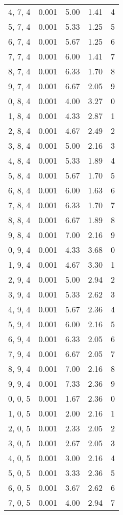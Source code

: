 \documentclass[12pt]{article}
\begin{document}
\begin{tabular}{c || c || c | c | c}
4, 7, 4 & 0.001 & 5.00 & 1.41 & 4 \\
5, 7, 4 & 0.001 & 5.33 & 1.25 & 5 \\
6, 7, 4 & 0.001 & 5.67 & 1.25 & 6 \\
7, 7, 4 & 0.001 & 6.00 & 1.41 & 7 \\
8, 7, 4 & 0.001 & 6.33 & 1.70 & 8 \\
9, 7, 4 & 0.001 & 6.67 & 2.05 & 9 \\
0, 8, 4 & 0.001 & 4.00 & 3.27 & 0 \\
1, 8, 4 & 0.001 & 4.33 & 2.87 & 1 \\
2, 8, 4 & 0.001 & 4.67 & 2.49 & 2 \\
3, 8, 4 & 0.001 & 5.00 & 2.16 & 3 \\
4, 8, 4 & 0.001 & 5.33 & 1.89 & 4 \\
5, 8, 4 & 0.001 & 5.67 & 1.70 & 5 \\
6, 8, 4 & 0.001 & 6.00 & 1.63 & 6 \\
7, 8, 4 & 0.001 & 6.33 & 1.70 & 7 \\
8, 8, 4 & 0.001 & 6.67 & 1.89 & 8 \\
9, 8, 4 & 0.001 & 7.00 & 2.16 & 9 \\
0, 9, 4 & 0.001 & 4.33 & 3.68 & 0 \\
1, 9, 4 & 0.001 & 4.67 & 3.30 & 1 \\
2, 9, 4 & 0.001 & 5.00 & 2.94 & 2 \\
3, 9, 4 & 0.001 & 5.33 & 2.62 & 3 \\
4, 9, 4 & 0.001 & 5.67 & 2.36 & 4 \\
5, 9, 4 & 0.001 & 6.00 & 2.16 & 5 \\
6, 9, 4 & 0.001 & 6.33 & 2.05 & 6 \\
7, 9, 4 & 0.001 & 6.67 & 2.05 & 7 \\
8, 9, 4 & 0.001 & 7.00 & 2.16 & 8 \\
9, 9, 4 & 0.001 & 7.33 & 2.36 & 9 \\
0, 0, 5 & 0.001 & 1.67 & 2.36 & 0 \\
1, 0, 5 & 0.001 & 2.00 & 2.16 & 1 \\
2, 0, 5 & 0.001 & 2.33 & 2.05 & 2 \\
3, 0, 5 & 0.001 & 2.67 & 2.05 & 3 \\
4, 0, 5 & 0.001 & 3.00 & 2.16 & 4 \\
5, 0, 5 & 0.001 & 3.33 & 2.36 & 5 \\
6, 0, 5 & 0.001 & 3.67 & 2.62 & 6 \\
7, 0, 5 & 0.001 & 4.00 & 2.94 & 7 \\

\end{tabular}
\end{document}
